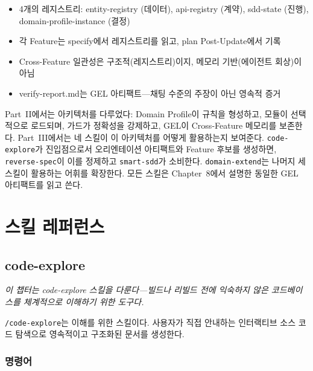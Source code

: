 \documentclass[11pt,a4paper,openright,twoside]{report}
\newcommand{\cmd}[1]{\texttt{/#1}}
\begin{document}
\begin{tipbox}[챕터 8 핵심 요약]
\begin{itemize}[nosep]
  \item 4개의 레지스트리: entity-registry (데이터), api-registry (계약), sdd-state (진행), domain-profile-instance (결정)
  \item 각 Feature는 specify에서 레지스트리를 읽고, plan Post-Update에서 기록
  \item Cross-Feature 일관성은 구조적(레지스트리)이지, 메모리 기반(에이전트 회상)이 아님
  \item verify-report.md는 GEL 아티팩트---채팅 수준의 주장이 아닌 영속적 증거
\end{itemize}
\end{tipbox}

Part~II에서는 아키텍처를 다루었다: Domain Profile이 규칙을 형성하고, 모듈이 선택적으로 로드되며, 가드가 정확성을 강제하고, GEL이 Cross-Feature 메모리를 보존한다. Part~III에서는 네 스킬이 이 아키텍처를 어떻게 활용하는지 보여준다. \texttt{code-explore}가 진입점으로서 오리엔테이션 아티팩트와 Feature 후보를 생성하면, \texttt{reverse-spec}이 이를 정제하고 \texttt{smart-sdd}가 소비한다. \texttt{domain-extend}는 나머지 세 스킬이 활용하는 어휘를 확장한다. 모든 스킬은 Chapter~8에서 설명한 동일한 GEL 아티팩트를 읽고 쓴다.

\part{스킬 레퍼런스}

\chapter{code-explore}
\label{ch:code-explore}

\textit{이 챕터는 code-explore 스킬을 다룬다---빌드나 리빌드 전에 익숙하지 않은 코드베이스를 체계적으로 이해하기 위한 도구다.}

\cmd{code-explore}는 이해를 위한 스킬이다. 사용자가 직접 안내하는 인터랙티브 소스 코드 탐색으로 영속적이고 구조화된 문서를 생성한다.

\section{명령어}
\end{document}
